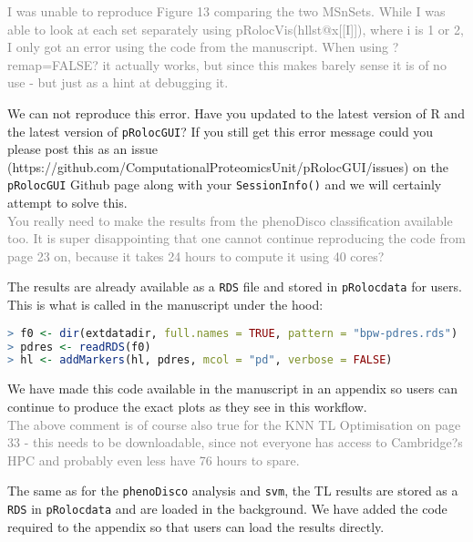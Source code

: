 \documentclass[11pt]{article}
\begin{document}
\textcolor{gray}{I was unable to reproduce Figure 13 comparing the two MSnSets. While I was able to look at each set separately using pRolocVis(hllst@x[[I]]), where i is 1 or 2, I only got an error using the code from the manuscript. When using ?remap=FALSE? it actually works, but since this makes barely sense it is of no use - but just as a hint at debugging it.} 

We can not reproduce this error. Have you updated to the latest version of R and the latest version of \texttt{pRolocGUI}? If you still get this error message could you please post this as an issue \\
(https://github.com/ComputationalProteomicsUnit/pRolocGUI/issues) on the \texttt{pRolocGUI} Github page along with your \texttt{SessionInfo()} and we will certainly attempt to solve this. \\


\textcolor{gray} {You really need to make the results from the phenoDisco classification available too. It is super disappointing that one cannot continue reproducing the code from page 23 on, because it takes 24 hours to compute it using 40 cores?} 

The results are already available as a \texttt{RDS} file and stored in \texttt{pRolocdata} for users. This is what is called in the manuscript under the hood: \\

\small{
\begin{lstlisting}[language=R] 
> f0 <- dir(extdatadir, full.names = TRUE, pattern = "bpw-pdres.rds")
> pdres <- readRDS(f0)
> hl <- addMarkers(hl, pdres, mcol = "pd", verbose = FALSE)
\end{lstlisting}}

We have made this code available in the manuscript in an appendix so users can continue to produce the exact plots as they see in this workflow. \\


\textcolor{gray} {The above comment is of course also true for the KNN TL Optimisation on page 33 - this needs to be downloadable, since not everyone has access to Cambridge?s HPC and probably even less have 76 hours to spare.} 

The same as for the \texttt{phenoDisco} analysis and \texttt{svm}, the TL results are stored as a \texttt{RDS} in \texttt{pRolocdata} and are loaded in the background. We have added the code required to the appendix so that users can load the results directly. \\
 
\end{document}

